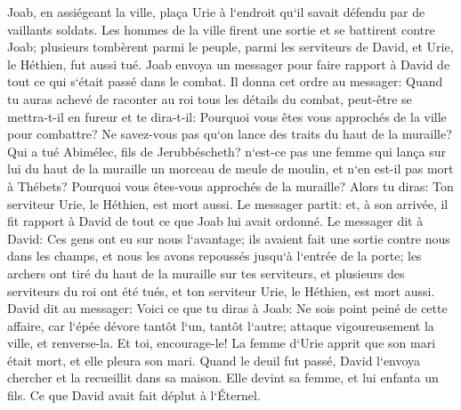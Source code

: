 \verse Joab, en assiégeant la ville, plaça Urie à l`endroit qu`il savait défendu par de vaillants soldats. 
\verse Les hommes de la ville firent une sortie et se battirent contre Joab; plusieurs tombèrent parmi le peuple, parmi les serviteurs de David, et Urie, le Héthien, fut aussi tué. 
\verse Joab envoya un messager pour faire rapport à David de tout ce qui s`était passé dans le combat. 
\verse Il donna cet ordre au messager: Quand tu auras achevé de raconter au roi tous les détails du combat, 
\verse peut-être se mettra-t-il en fureur et te dira-t-il: Pourquoi vous êtes vous approchés de la ville pour combattre? Ne savez-vous pas qu`on lance des traits du haut de la muraille? 
\verse Qui a tué Abimélec, fils de Jerubbéscheth? n`est-ce pas une femme qui lança sur lui du haut de la muraille un morceau de meule de moulin, et n`en est-il pas mort à Thébets? Pourquoi vous êtes-vous approchés de la muraille? Alors tu diras: Ton serviteur Urie, le Héthien, est mort aussi. 
\verse Le messager partit: et, à son arrivée, il fit rapport à David de tout ce que Joab lui avait ordonné. 
\verse Le messager dit à David: Ces gens ont eu sur nous l`avantage; ils avaient fait une sortie contre nous dans les champs, et nous les avons repoussés jusqu`à l`entrée de la porte; 
\verse les archers ont tiré du haut de la muraille sur tes serviteurs, et plusieurs des serviteurs du roi ont été tués, et ton serviteur Urie, le Héthien, est mort aussi. 
\verse David dit au messager: Voici ce que tu diras à Joab: Ne sois point peiné de cette affaire, car l`épée dévore tantôt l`un, tantôt l`autre; attaque vigoureusement la ville, et renverse-la. Et toi, encourage-le! 
\verse La femme d`Urie apprit que son mari était mort, et elle pleura son mari. 
\verse Quand le deuil fut passé, David l`envoya chercher et la recueillit dans sa maison. Elle devint sa femme, et lui enfanta un fils. Ce que David avait fait déplut à l`Éternel. 

\chapter{}

